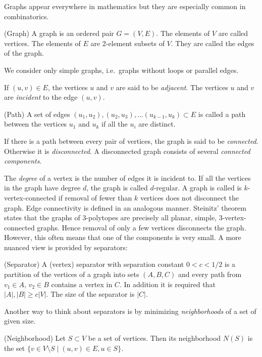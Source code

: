 Graphs appear everywhere in mathematics but they are especially common in 
combinatorics. 

\begin{definition}
(Graph) A graph is an ordered pair $G=(V,E)$. The elements of $V$ are called 
vertices. The elements of $E$ are 2-element subsets of $V$. They are called 
the edges of the graph. 
\end{definition}
We consider only simple graphs, i.e.\ graphs without loops or parallel 
edges.

If $(u,v) \in E$, the vertices $u$ and $v$ are said to be \textit{adjacent}. 
The vertices $u$ and $v$ are \textit{incident} to the edge $(u,v)$. 
\begin{definition}
 (Path) A set of edges $(u_1, u_2), (u_2, u_3), \dots (u_{k-1}, u_k) \subset E$ 
is called a path between the vertices $u_1$ and $u_k$ if all the $u_i$ are 
distinct.
\end{definition}
If there is a path between every pair of vertices, the graph is said to be 
\textit{connected}. Otherwise it is \textit{disconnected}. A disconnected graph 
consists of several \textit{connected components}.

The \textit{degree} of a vertex is the number of edges it is incident to. 
If all the vertices in the graph have degree $d$, the graph is called 
$d$-regular. A graph is called is $k$-vertex-connected if removal of fewer than 
$k$ vertices does not disconnect the graph. Edge connectivity is defined in an 
analogous manner. Steinitz' theorem states that the graphs of 
3-polytopes are precisely all planar, simple, 3-vertex-connected graphs. Hence 
removal of only a few vertices disconnects the graph. However, this
often means that one of the components is very small. A more nuanced view is 
provided 
by separators:

\begin{definition}
(Separator) A (vertex) separator with separation constant $0<c<1/2$ is a 
partition of the vertices of a graph into 
sets $(A,B,C)$ and every path from $v_1 \in A$, $v_2 \in B$ contains a vertex 
in $C$. In addition it is required that $|A|, |B| \geq c|V|$. The size of the 
separator is $|C|$.  
\end{definition}

Another way to think about separators is by minimizing \textit{neighborhoods} 
of a set of given size.

\begin{definition}
 (Neighborhood) Let $S \subset V$ be a set of vertices. Then its neighborhood 
$N(S)$ is the set $\{v \in V\setminus S \mid (u,v) \in E, u \in S\}$. 
\end{definition}

